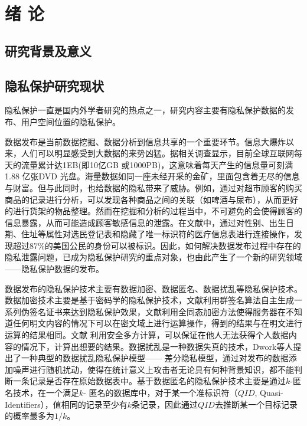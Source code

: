 \chapter{绪\hskip 0.4cm 论}
\label{chap1}

\section{研究背景及意义}


\section{隐私保护研究现状}
隐私保护一直是国内外学者研究的热点之一，研究内容主要有隐私保护数据的发布、用户空间位置的隐私保护。

数据发布是当前数据挖掘、数据分析到信息共享的一个重要环节。信息大爆炸以来，人们可以明显感受到大数据的来势凶猛。据相关调查显示，目前全球互联网每天的流量累计达1EB(即10亿GB 或1000PB)，这意味着每天产生的信息量可刻满1.88 亿张DVD 光盘。海量数据如同一座未经开采的金矿，里面包含着无尽的信息与财富。但与此同时，也给数据的隐私带来了威胁。例如，通过对超市顾客的购买商品的记录进行分析，可以发现各种商品之间的关联（如啤酒与尿布），从而更好的进行货架的物品整理。然而在挖掘和分析的过程当中，不可避免的会使得顾客的信息暴露，从而可能造成顾客敏感信息的泄露。在文献\cite{sweeney}中，通过对性别、出生日期、住址等属性对选民登记表和隐藏了唯一标识符的医疗信息表进行连接操作，发现超过87\%的美国公民的身份可以被标识。因此，如何解决数据发布过程中存在的隐私泄露问题，已成为隐私保护研究的重点对象，也由此产生了一个新的研究领域——隐私保护数据的发布。

数据发布的隐私保护技术主要有数据加密、数据匿名、数据扰乱等隐私保护技术。数据加密技术主要是基于密码学的隐私保护技术，文献\cite{group}利用群签名算法自主生成一系列伪签名证书来达到隐私保护效果，文献\cite{homomor}利用全同态加密方法使得服务器在不知道任何明文内容的情况下可以在密文域上进行运算操作，得到的结果与在明文进行运算的结果相同。文献\cite{muticompute} 利用安全多方计算，可以保证在他人无法获得个人数据内容的情况下，计算出想要的结果。数据扰乱是一种数据失真的技术，Dwork等人提出了一种典型的数据扰乱隐私保护模型—— 差分隐私模型\cite{differential}，通过对发布的数据添加噪声进行随机扰动，使得在统计意义上攻击者无论具有何种背景知识，都不能判断一条记录是否存在原始数据表中。基于数据匿名的隐私保护技术主要是通过{$k$}-匿名技术\cite{kanonomy}，在一个满足{$k$}- 匿名的数据库中，对于某一个准标识符（{$QID$}, Quasi-Identifiers），值相同的记录至少有{$k$}条记录，因此通过{$QID$}去推断某一个目标记录的概率最多为{$1/k$}。

